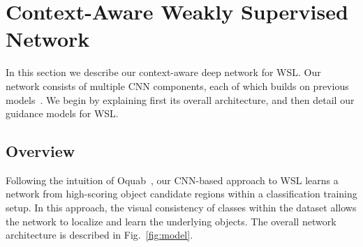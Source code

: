 \documentclass[runningheads]{llncs}
\begin{document}
\section{Context-Aware Weakly Supervised Network}

In this section we describe our context-aware deep network for WSL.  Our network
consists of multiple CNN components, each of which builds on previous
models~\cite{Oquab:2015us,Girshick_2015_ICCV,Bilen:2015uo,Gidaris:2015cx}. We
begin by explaining first its overall architecture, and then detail our guidance
models for WSL.

\subsection{Overview}

Following the intuition of
Oquab~\etal\cite{Oquab:2015us}, our CNN-based approach to WSL learns a network from high-scoring object
candidate regions within a classification training setup. In this approach, the
visual consistency of classes within the dataset allows the network to localize
and learn the underlying objects. The overall network architecture is described
in Fig.~\ref{fig:model}.
\end{document}
